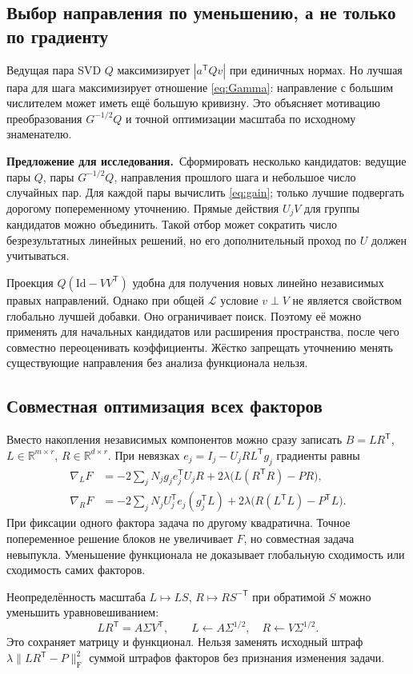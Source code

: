 \documentclass[11pt,a4paper]{article}
\numberwithin{equation}{section}
\theoremstyle{remark}
\newcommand{\R}{\mathbb R}
\newcommand{\Id}{\mathrm{Id}}
\newcommand{\T}{^{\mathsf T}}
\newcommand{\F}{_{\mathrm F}}
\newcommand{\proposal}{\par\noindent\textbf{Предложение для исследования.}\ }
\begin{document}
\subsection{Выбор направления по уменьшению, а не только по градиенту}
Ведущая пара SVD $Q$ максимизирует $|a\T Qv|$ при единичных нормах.
Но лучшая пара для шага максимизирует отношение \eqref{eq:Gamma}:
направление с большим числителем может иметь ещё большую кривизну.
Это объясняет мотивацию преобразования $G^{-1/2}Q$ и точной оптимизации
масштаба по исходному знаменателю.

\proposal Сформировать несколько кандидатов: ведущие пары $Q$, пары
$G^{-1/2}Q$, направления прошлого шага и небольшое число случайных пар.
Для каждой пары вычислить \eqref{eq:gain}; только лучшие подвергать
дорогому попеременному уточнению. Прямые действия $U_jV$ для группы кандидатов
можно объединить. Такой отбор может сократить число безрезультатных
линейных решений, но его дополнительный проход по $U$ должен учитываться.

Проекция $Q(\Id-VV\T)$ удобна для получения новых линейно независимых
правых направлений. Однако при общей $\mathcal L$ условие $v\perp V$
не является свойством глобально лучшей добавки. Оно ограничивает поиск.
Поэтому её можно применять для начальных кандидатов или расширения
пространства, после чего совместно переоценивать коэффициенты.
Жёстко запрещать уточнению менять существующие направления без анализа
функционала нельзя.

\subsection{Совместная оптимизация всех факторов}
Вместо накопления независимых компонентов можно сразу записать
$B=LR\T$, $L\in\R^{m\times r}$, $R\in\R^{d\times r}$.
При невязках $e_j=I_j-U_jR L\T g_j$ градиенты равны
\begin{align}
 \nabla_L F&=-2\sum_jN_jg_je_j\T U_jR
              +2\lambda\bigl(L(R\T R)-PR\bigr),\label{eq:gradL}\\
 \nabla_R F&=-2\sum_jN_jU_j\T e_j(g_j\T L)
              +2\lambda\bigl(R(L\T L)-P\T L\bigr).\label{eq:gradR}
\end{align}
При фиксации одного фактора задача по другому квадратична.
Точное попеременное решение блоков не увеличивает $F$, но совместная
задача невыпукла. Уменьшение функционала не доказывает глобальную сходимость
или сходимость самих факторов.

Неопределённость масштаба $L\mapsto LS$, $R\mapsto RS^{-\mathsf T}$
при обратимой $S$ можно уменьшить уравновешиванием:
\[
 LR\T=A\Sigma V\T,
 \qquad L\leftarrow A\Sigma^{1/2},\quad R\leftarrow V\Sigma^{1/2}.
\]
Это сохраняет матрицу и функционал. Нельзя заменять исходный штраф
$\lambda\|LR\T-P\|\F^2$ суммой штрафов факторов без признания изменения задачи.
\end{document}
